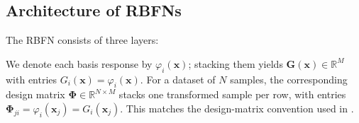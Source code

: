 \subsection{Architecture of RBFNs}
\label{sec:rbf_architecture_of_rbfns}

The RBFN consists of three layers:

\begin{tcolorbox}[summarybox, title={Notation and shapes}]
We denote each basis response by \(\varphi_i(\mathbf{x})\); stacking them yields \(\mathbf{G}(\mathbf{x})\in\mathbb{R}^M\) with entries \(G_i(\mathbf{x})=\varphi_i(\mathbf{x})\). For a dataset of \(N\) samples, the corresponding design matrix \(\boldsymbol{\Phi}\in\mathbb{R}^{N\times M}\) stacks one transformed sample per row, with entries \(\boldsymbol{\Phi}_{ji}=\varphi_i(\mathbf{x}_j)=G_i(\mathbf{x}_j)\). This matches the design-matrix convention used in .
\end{tcolorbox}


